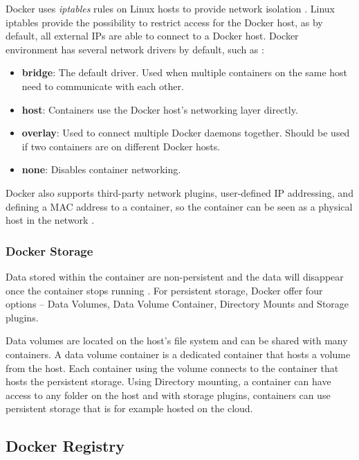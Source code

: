\documentclass[fleqn,12pt]{olplainarticle}
\begin{document}
Docker uses \textit{iptables} rules on Linux hosts to provide network isolation \citep{docker:iptables}. Linux iptables provide the possibility to restrict access for the Docker host, as by default, all external IPs are able to connect to a Docker host. Docker environment has several network drivers by default, such as \citep{docker:network}:

\begin{itemize}
    \item \textbf{bridge}: The default driver. Used when multiple containers on the same host need to communicate with each other.
    \item \textbf{host}: Containers use the Docker host's networking layer directly.
    \item \textbf{overlay}: Used to connect multiple Docker daemons together. Should be used if two containers are on different Docker hosts.
    \item \textbf{none}: Disables container networking.  
\end{itemize}

Docker also supports third-party network plugins, user-defined IP addressing, and defining a MAC address to a container, so the container can be seen as a physical host in the network \citep{docker:network}.

\subsubsection{Docker Storage}

Data stored within the container are non-persistent and the data will disappear once the container stops running \citep{aquasec:docker_architecture}. For persistent storage, Docker offer four options – Data Volumes, Data Volume Container, Directory Mounts and Storage plugins. 

Data volumes are located on the host's file system and can be shared with many containers. A data volume container is a dedicated container that hosts a volume from the host. Each container using the volume connects to the container that hosts the persistent storage. Using Directory mounting, a container can have access to any folder on the host and with storage plugins, containers can use persistent storage that is for example hosted on the cloud.

\subsection{Docker Registry}
\end{document}

